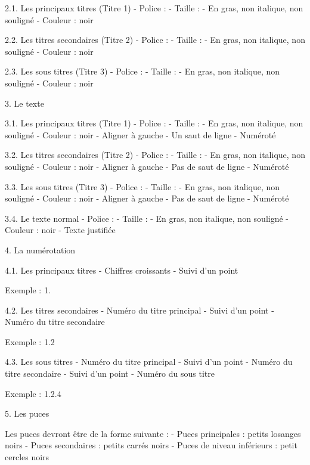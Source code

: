    2.1. Les principaux titres (Titre 1)
        - Police : 
        - Taille : 
        - En gras, non italique, non souligné
        - Couleur : noir

   2.2. Les titres secondaires (Titre 2)
        - Police : 
        - Taille : 
        - En gras, non italique, non souligné
        - Couleur : noir

   2.3. Les sous titres (Titre 3)
        - Police : 
        - Taille : 
        - En gras, non italique, non souligné
        - Couleur : noir

3. Le texte

   3.1. Les principaux titres (Titre 1)
        - Police : 
        - Taille : 
        - En gras, non italique, non souligné
        - Couleur : noir
        - Aligner à gauche
        - Un saut de ligne
        - Numéroté

   3.2. Les titres secondaires (Titre 2)
        - Police : 
        - Taille : 
        - En gras, non italique, non souligné
        - Couleur : noir
        - Aligner à gauche
        - Pas de saut de ligne
        - Numéroté

   3.3. Les sous titres (Titre 3)
        - Police : 
        - Taille : 
        - En gras, non italique, non souligné
        - Couleur : noir
        - Aligner à gauche
        - Pas de saut de ligne
        - Numéroté

   3.4. Le texte normal
        - Police : 
        - Taille : 
        - En gras, non italique, non souligné
        - Couleur : noir
        - Texte justifiée

4. La numérotation
   
   4.1. Les principaux titres
        - Chiffres croissants
        - Suivi d'un point

        Exemple : 1.

   4.2. Les titres secondaires
      - Numéro du titre principal
      - Suivi d'un point
      - Numéro du titre secondaire

        Exemple : 1.2

   4.3. Les sous titres
     - Numéro du titre principal
      - Suivi d'un point
      - Numéro du titre secondaire
      - Suivi d'un point
      - Numéro du sous titre

        Exemple : 1.2.4

5. Les puces

   Les puces devront être de la forme suivante :
   - Puces principales : petits losanges noirs
   - Puces secondaires : petits carrés noirs
   - Puces de niveau inférieurs : petit cercles noirs

